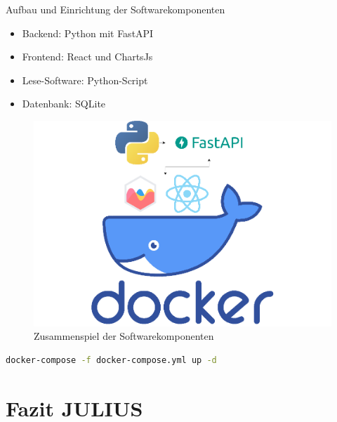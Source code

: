 \documentclass[10pt,ngerman]{beamer}
\begin{document}
\begin{frame}[fragile]{Aufbau und Einrichtung der Softwarekomponenten}

  \begin{minipage}[t]{0.49\textwidth}
    \begin{itemize}
      \item Backend: Python mit FastAPI
      \item Frontend: React und ChartsJs
      \item Lese-Software: Python-Script
      \item Datenbank: SQLite
    \end{itemize}
  \end{minipage}
  \begin{minipage}[t]{0.49\textwidth}
    \begin{figure}
      \centering
      \includegraphics[width=1\textwidth]{pictures/SoftwareKomponenten.png}
      \caption{Zusammenspiel der Softwarekomponenten}
    \end{figure}
  \end{minipage}

  \begin{lstlisting}[language=Bash]
    docker-compose -f docker-compose.yml up -d
  \end{lstlisting}
\end{frame}

\section{Fazit JULIUS}

\end{document}
